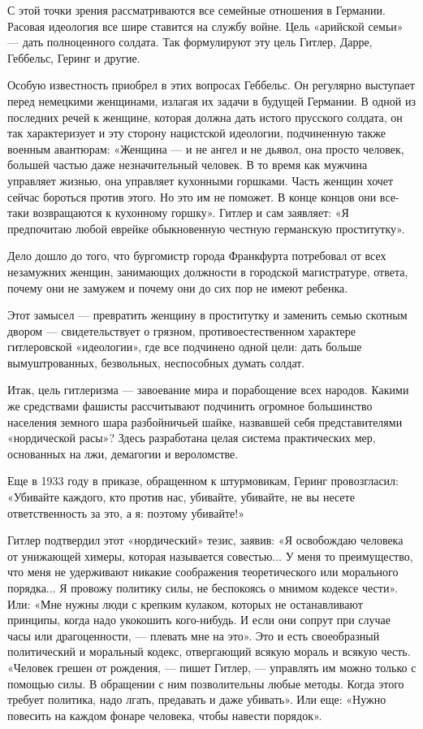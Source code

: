 \documentclass[12pt, a4paper, openany]{book}
\begin{document}
С этой точки зрения рассматриваются все семейные отношения в Германии. Расовая идеология все шире ставится на службу войне. Цель «арийской семьи» — дать полноценного солдата. Так формулируют эту цель Гитлер, Дарре, Геббельс, Геринг и другие.

Особую известность приобрел в этих вопросах Геббельс. Он регулярно выступает перед немецкими женщинами, излагая их задачи в будущей Германии. В одной из последних речей к женщине, которая должна дать истого прусского солдата, он так характеризует и эту сторону нацистской идеологии, подчиненную также военным авантюрам: «Женщина — и не ангел и не дьявол, она просто человек, большей частью даже незначительный человек. В то время как мужчина управляет жизнью, она управляет кухонными горшками. Часть женщин хочет сейчас бороться против этого. Но это им не поможет. В конце концов они все-таки возвращаются к кухонному горшку». Гитлер и сам заявляет: «Я предпочитаю любой еврейке обыкновенную честную германскую проститутку».

Дело дошло до того, что бургомистр города Франкфурта потребовал от всех незамужних женщин, занимающих должности в городской магистратуре, ответа, почему они не замужем и почему они до сих пор не имеют ребенка.

Этот замысел — превратить женщину в проститутку и заменить семью скотным двором — свидетельствует о грязном, противоестественном характере гитлеровской «идеологии», где все подчинено одной цели: дать больше вымуштрованных, безвольных, неспособных думать солдат.

Итак, цель гитлеризма — завоевание мира и порабощение всех народов. Какими же средствами фашисты рассчитывают подчинить огромное большинство населения земного шара разбойничьей шайке, назвавшей себя представителями «нордической расы»? Здесь разработана целая система практических мер, основанных на лжи, демагогии и вероломстве.

Еще в 1933 году в приказе, обращенном к штурмовикам, Геринг провозгласил: «Убивайте каждого, кто против нас, убивайте, убивайте, не вы несете ответственность за это, а я: поэтому убивайте!»

Гитлер подтвердил этот «нордический» тезис, заявив: «Я освобождаю человека от унижающей химеры, которая называется совестью... У меня то преимущество, что меня не удерживают никакие соображения теоретического или морального порядка... Я провожу политику силы, не беспокоясь о мнимом кодексе чести». Или: «Мне нужны люди с крепким кулаком, которых не останавливают принципы, когда надо укокошить кого-нибудь. И если они сопрут при случае часы или драгоценности, — плевать мне на это». Это и есть своеобразный политический и моральный кодекс, отвергающий всякую мораль и всякую честь. «Человек грешен от рождения, — пишет Гитлер, — управлять им можно только с помощью силы. В обращении с ним позволительны любые методы. Когда этого требует политика, надо лгать, предавать и даже убивать». Или еще: «Нужно повесить на каждом фонаре человека, чтобы навести порядок».
\end{document}
